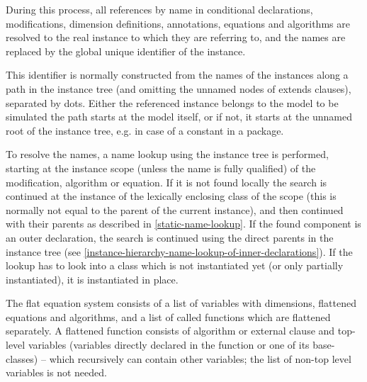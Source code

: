 During this process, all references by name in conditional declarations,
modifications, dimension definitions, annotations, equations and
algorithms are resolved to the real instance to which they are referring
to, and the names are replaced by the global unique identifier of the
instance.

\begin{nonnormative}
This identifier is normally constructed from the names of the instances along a path in the instance tree (and omitting the unnamed nodes of extends clauses), separated
by dots.  Either the referenced instance belongs to the model to be simulated the path starts at the model itself, or if not, it starts at the unnamed root of the instance
tree, e.g. in case of a constant in a package.
\end{nonnormative}

\begin{nonnormative}
To resolve the names, a name lookup using the instance tree is performed, starting at the instance scope (unless the name is fully qualified) of the modification, algorithm
or equation.  If it is not found locally the search is continued at the instance of the lexically enclosing class of the scope (this is normally not equal to the parent of
the current instance), and then continued with their parents as described in \autoref{static-name-lookup}.  If the found component is an outer declaration, the search is
continued using the direct parents in the instance tree (see \autoref{instance-hierarchy-name-lookup-of-inner-declarations}).  If the lookup has to look into a class which
is not instantiated yet (or only partially instantiated), it is instantiated in place.
\end{nonnormative}

The flat equation system consists of a list of variables with
dimensions, flattened equations and algorithms, and a list of called
functions which are flattened separately. A flattened function consists
of algorithm or external clause and top-level variables (variables
directly declared in the function or one of its base-classes) -- which
recursively can contain other variables; the list of non-top level
variables is not needed.

